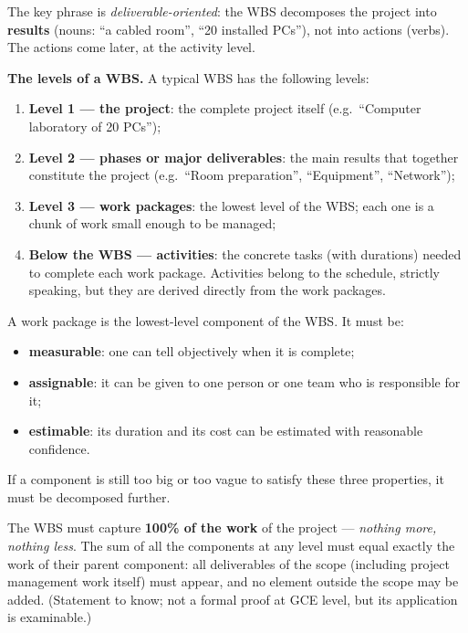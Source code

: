 \documentclass[11pt]{article}
\newcommand{\cle}[1]{{\popxbold\color{popdark}#1}}
\begin{document}
The key phrase is \emph{deliverable-oriented}: the WBS decomposes the project into \textbf{results} (nouns: ``a cabled room'', ``20 installed PCs''), not into actions (verbs). The actions come later, at the activity level.

\textbf{The levels of a WBS.} A typical WBS has the following levels:
\begin{enumerate}
\item \textbf{Level 1 --- the project}: the complete project itself (e.g.\ ``Computer laboratory of 20 PCs'');
\item \textbf{Level 2 --- phases or major deliverables}: the main results that together constitute the project (e.g.\ ``Room preparation'', ``Equipment'', ``Network'');
\item \textbf{Level 3 --- work packages}: the lowest level of the WBS; each one is a chunk of work small enough to be managed;
\item \textbf{Below the WBS --- activities}: the concrete tasks (with durations) needed to complete each work package. Activities belong to the schedule, strictly speaking, but they are derived directly from the work packages.
\end{enumerate}

\begin{definition}
A \cle{work package} is the lowest-level component of the WBS. It must be:
\begin{itemize}
\item \textbf{measurable}: one can tell objectively when it is complete;
\item \textbf{assignable}: it can be given to one person or one team who is responsible for it;
\item \textbf{estimable}: its duration and its cost can be estimated with reasonable confidence.
\end{itemize}
If a component is still too big or too vague to satisfy these three properties, it must be decomposed further.
\end{definition}

\begin{propriete}
The WBS must capture \textbf{100\% of the work} of the project --- \emph{nothing more, nothing less}. The sum of all the components at any level must equal exactly the work of their parent component: all deliverables of the scope (including project management work itself) must appear, and no element outside the scope may be added. (Statement to know; not a formal proof at GCE level, but its application is examinable.)
\end{propriete}
\end{document}
